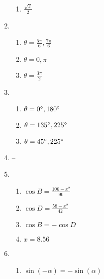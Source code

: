 \documentclass{article}
\begin{document}
\begin{enumerate}
\begin{enumerate}
	\item $\frac{\sqrt{2}}{2}$
	
	\end{enumerate}
	
\item

	\begin{enumerate}
	
	\item $\theta = \frac{5\pi}{6}, \frac{7\pi}{6}$
	
	\item $\theta = 0, \pi$
	
	\item $\theta = \frac{3\pi}{2}$
	
	\end{enumerate}
	
\item

	\begin{enumerate}
	
	\item $\theta = 0\degree, 180\degree$
	
	\item $\theta = 135\degree, 225\degree$
	
	\item $\theta = 45\degree, 225\degree$
	
	\end{enumerate}
	
\item --

\item

	\begin{enumerate}

	\item $\cos{B} = \frac{106 - x^2}{90}$
	
	\item $\cos{D} = \frac{58 - x^2}{42}$
	
	\item $\cos{B} = -\cos{D}$
	
	\item $x = 8.56$
	
	\end{enumerate}
	
\item

	\begin{enumerate}
	
	\item $\sin{(-\alpha)} = -\sin{(\alpha)}$
	

\end{enumerate}
\end{enumerate}
\end{document}
